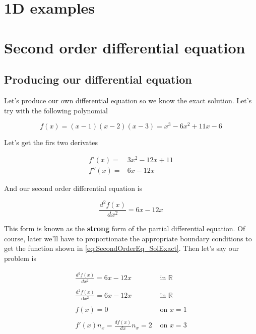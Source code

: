 \documentclass[letterpaper,10pt]{article}
\newcommand{\diff}[2]{ 
\frac{\mathrm{d}#1}{\mathrm{d}#2} 
}
\begin{document}
\section{1D examples}

\section{Second order differential equation}

\subsection{Producing our differential equation}

Let's produce our own differential equation so we know the exact solution. Let's try with the following polynomial

\begin{equation}
f(x) = (x-1)(x-2)(x-3) = x^3 - 6x^2 + 11x - 6
\label{eq:SecondOrderEq_SolExact}
\end{equation}

Let's get the firs two derivates

\[
\begin{array}{rl}
f'(x) = & 3x^2 - 12x + 11 \\
f''(x) = & 6x - 12x
\end{array}
\]

And our second order differential equation is

\begin{equation}
\frac{d^2 f(x)}{dx^2} = 6x - 12x
\label{eq:SecondOrderEq}
\end{equation}

This form is known as the \textbf{strong} form of the partial differential equation. Of course, later we'll have to proportionate the appropriate boundary conditions to get the function shown in \ref{eq:SecondOrderEq_SolExact}. Then let's say our problem is





\begin{equation}
\begin{array}{rl}
\displaystyle
\frac{d^2 f(x)}{dx^2} = 6x - 12x & \textrm{ in } \mathbb{R} \\ \\
\displaystyle
\diff{^2 f(x)}{x^2} = 6x - 12x & \textrm{ in } \mathbb{R} \\ \\
\displaystyle
f(x) = 0 & \textrm{ on } x = 1 \\ \\
\displaystyle
f'(x) n_x = \frac{d f(x)}{d x} n_x = 2 & \textrm{ on } x = 3 
\end{array}
\label{eq:Problem_StrongForm}
\end{equation}
\end{document}
